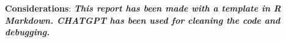\documentclass[fleqn,10pt]{latex/stylish_article} %
\begin{document}
\textbf{Considerations}: \textbf{\emph{This report has been made with a template in R Markdown. CHATGPT has been used for cleaning the code and debugging.}}



\makeatletter

\makeatother


\end{document}
